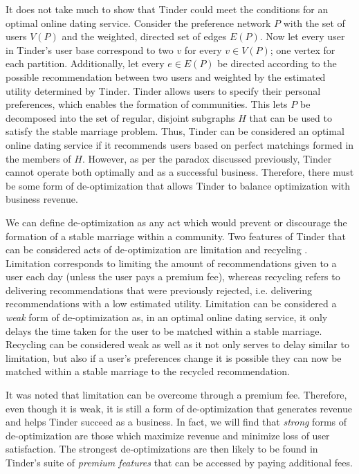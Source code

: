 It does not take much to show that Tinder could meet the conditions for an optimal online dating service. Consider the preference network $P$ with the set of users $V(P)$ and the weighted, directed set of edges $E(P)$. Now let every user in Tinder's user base correspond to two $v$ for every $v \in V(P)$; one vertex for each partition. Additionally, let every $e \in E(P)$ be directed according to the possible recommendation between two users and weighted by the estimated utility determined by Tinder. Tinder allows users to specify their personal preferences, which enables the formation of communities. This lets $P$ be decomposed into the set of regular, disjoint subgraphs $H$ that can be used to satisfy the stable marriage problem. Thus, Tinder can be considered an optimal online dating service if it recommends users based on perfect matchings formed in the members of $H$. However, as per the paradox discussed previously, Tinder cannot operate both optimally and as a successful business. Therefore, there must be some form of de-optimization that allows Tinder to balance optimization with business revenue.

We can define de-optimization as any act which would prevent or discourage the formation of a stable marriage within a community. Two features of Tinder that can be considered acts of de-optimization are limitation and recycling \citep{Tiffany2019}. Limitation corresponds to limiting the amount of recommendations given to a user each day (unless the user pays a premium fee), whereas recycling refers to delivering recommendations that were previously rejected, i.e. delivering recommendations with a low estimated utility. Limitation can be considered a \textit{weak} form of de-optimization as, in an optimal online dating service, it only delays the time taken for the user to be matched within a stable marriage. Recycling can be considered weak as well as it not only serves to delay similar to limitation, but also if a user's preferences change it is possible they can now be matched within a stable marriage to the recycled recommendation.

It was noted that limitation can be overcome through a premium fee. Therefore, even though it is weak, it is still a form of de-optimization that generates revenue and helps Tinder succeed as a business. In fact, we will find that \textit{strong} forms of de-optimization are those which maximize revenue and minimize loss of user satisfaction. The strongest de-optimizations are then likely to be found in Tinder's suite of \textit{premium features} that can be accessed by paying additional fees.

